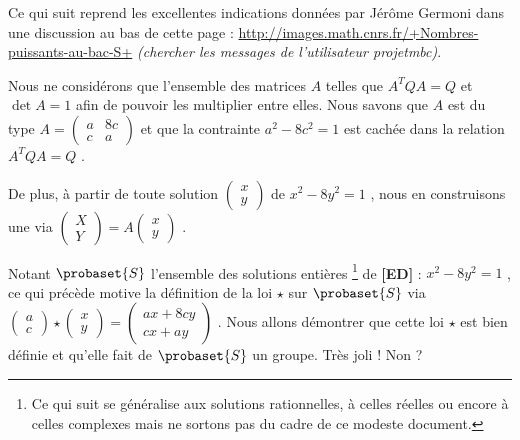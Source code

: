 Ce qui suit reprend les excellentes indications données par Jérôme Germoni dans une discussion au bas de cette page :
\url{http://images.math.cnrs.fr/+Nombres-puissants-au-bac-S+}
\textit{(chercher les messages de l'utilisateur projetmbc)}.


\bigskip

Nous ne considérons que l'ensemble des matrices $A$ telles que $A^T Q A = Q$ et $\det A = 1$ afin de pouvoir les multiplier entre elles. Nous savons que $A$ est du type 
$A
=
\begin{pmatrix} 
  a & 8c \\ 
  c & a
\end{pmatrix}$ 
et que la contrainte $a^2 - 8c^2 = 1$ est cachée dans la relation $A^T Q A = Q$ .


\medskip

De plus, à partir de toute solution 
$\begin{pmatrix} 
  x \\ 
  y 
\end{pmatrix}$
de $x^2 - 8 y^2 = 1$ , nous en construisons une  via
$\begin{pmatrix} 
  X \\ 
  Y 
\end{pmatrix}
=
A
\begin{pmatrix} 
  x \\ 
  y 
\end{pmatrix}$ .


\medskip

Notant $\probaset{S}$ l'ensemble des solutions entières
\footnote{
	Ce qui suit se généralise aux solutions rationnelles, à celles réelles ou encore à celles complexes mais ne sortons pas du cadre de ce modeste document.
}
de \textbf{[ED]} : $x^2 - 8 y^2 = 1$ , ce qui précède motive la définition de la loi $\star$ sur $\probaset{S}$ via
$\begin{pmatrix} 
  a \\ 
  c 
\end{pmatrix}
\star
\begin{pmatrix} 
  x \\ 
  y 
\end{pmatrix}
=
\begin{pmatrix} 
  a x + 8c y \\ 
  c x + a y
\end{pmatrix}$ .
Nous allons démontrer que cette loi $\star$ est bien définie et qu'elle fait de $\probaset{S}$ un groupe. Très joli ! Non ?


\medskip


